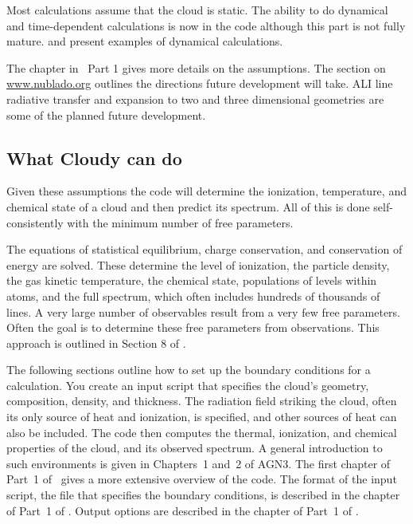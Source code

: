 \documentclass[12pt,twoside]{article}
\begin{document}
{Most calculations assume that the cloud is static.
The ability to do dynamical and time-dependent calculations is
now in the code although this part is not fully mature.
\citet{HenneyEtAl05} and \citet{HenneyEtAl07} present
examples of dynamical calculations.

The  chapter in \Hazy\ Part 1 gives more details on the assumptions.
The section  on \href{http://www.nublado.org}{www.nublado.org}
outlines the directions future development will take.
ALI line radiative transfer and expansion to two and three dimensional geometries
are some of the planned future development.

\subsection{What Cloudy can do}

Given these assumptions the code will determine the ionization,
temperature, and chemical state of a cloud and then predict its spectrum.
All of this is done self-consistently with the minimum number of free
parameters.

The equations of statistical equilibrium, charge conservation, and
conservation of energy are solved.  These determine the level of ionization,
the particle density, the gas kinetic temperature, the chemical state,
populations of levels within atoms, and the full spectrum, which often
includes hundreds of thousands of lines.  A very large number of observables
result from a very few free parameters.  Often the goal is to determine these
free parameters from observations.  This approach is outlined in Section
8 of \citet{Ferland03}.

The following sections outline how to set up the boundary conditions
for a calculation.  You create an input script that specifies the cloud's
geometry, composition, density, and thickness.  The radiation field striking
the cloud, often its only source of heat and ionization, is specified, and
other sources of heat can also be included.  The code then computes the
thermal, ionization, and chemical properties of the cloud, and its observed
spectrum.  A general introduction to such environments is given in
Chapters~1 and~2 of AGN3.  The first chapter
of Part~1 of \Hazy\ gives a more extensive
overview of the code.
The format of the input script, the file that
specifies the boundary conditions, is described in the chapter
 of Part~1 of \Hazy.
Output options are described in the
chapter  of Part~1 of \Hazy.

}
\end{document}
